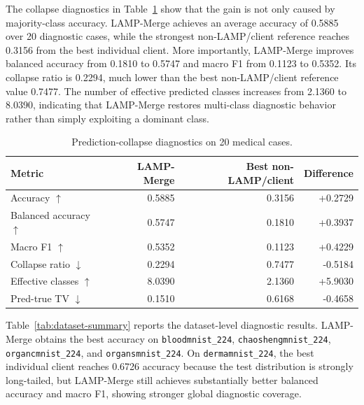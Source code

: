 The collapse diagnostics in Table~\ref{tab:collapse-key} show that the gain is not only caused by majority-class accuracy. LAMP-Merge achieves an average accuracy of 0.5885 over 20 diagnostic cases, while the strongest non-LAMP/client reference reaches 0.3156 from the best individual client. More importantly, LAMP-Merge improves balanced accuracy from 0.1810 to 0.5747 and macro F1 from 0.1123 to 0.5352. Its collapse ratio is 0.2294, much lower than the best non-LAMP/client reference value 0.7477. The number of effective predicted classes increases from 2.1360 to 8.0390, indicating that LAMP-Merge restores multi-class diagnostic behavior rather than simply exploiting a dominant class.

\begin{table}[t]
\centering
\caption{Prediction-collapse diagnostics on 20 medical cases.}
\label{tab:collapse-key}
\small
\begin{tabular}{lrrr}
\hline
Metric & LAMP-Merge & Best non-LAMP/client & Difference \\
\hline
Accuracy $\uparrow$ & 0.5885 & 0.3156 & +0.2729 \\
Balanced accuracy $\uparrow$ & 0.5747 & 0.1810 & +0.3937 \\
Macro F1 $\uparrow$ & 0.5352 & 0.1123 & +0.4229 \\
Collapse ratio $\downarrow$ & 0.2294 & 0.7477 & -0.5184 \\
Effective classes $\uparrow$ & 8.0390 & 2.1360 & +5.9030 \\
Pred-true TV $\downarrow$ & 0.1510 & 0.6168 & -0.4658 \\
\hline
\end{tabular}
\end{table}

Table~\ref{tab:dataset-summary} reports the dataset-level diagnostic results. LAMP-Merge obtains the best accuracy on \texttt{bloodmnist\_224}, \texttt{chaoshengmnist\_224}, \texttt{organcmnist\_224}, and \texttt{organsmnist\_224}. On \texttt{dermamnist\_224}, the best individual client reaches 0.6726 accuracy because the test distribution is strongly long-tailed, but LAMP-Merge still achieves substantially better balanced accuracy and macro F1, showing stronger global diagnostic coverage.


